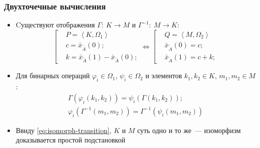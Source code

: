 \documentclass[12pt]{beamer}
\begin{document}
\begin{frame}
  \frametitle{Двухточечные вычисления}
  \begin{itemize}
  \item Cуществуют отображения $\Gamma:\ K \to M$ и $\Gamma^{-1}:\ M \to K$:
\begin{equation}
  \label{eq:isomorph-transition}
  \left[ \begin{aligned}
    & P=\left\langle K, \Omega_1 \right\rangle \\
    & c=\bar{x}_{\tilde A}\left( 0 \right); \\ 
    & k=\bar{x}_{\tilde A}\left( 1 \right)-\bar{x}_{\tilde A}\left( 0 \right);
  \end{aligned} \right.
  \Leftrightarrow 
  \left[ \begin{aligned}
    & Q=\left\langle M, \Omega_2 \right\rangle \\
    & \bar{x}_{\tilde A}\left( 0 \right)=c; \\ 
    & \bar{x}_{\tilde A}\left( 1 \right)=c+k;
  \end{aligned} \right.
\end{equation}
  \item Для бинарных операций $\varphi_i \in \Omega_1$, $\psi_i \in \Omega_2$ и элементов $k_1, k_2 \in K$, $m_1, m_2 \in M$:
\begin{gather}
  \label{eq:gomomorph-1}
  \Gamma\left( \varphi_i \left( k_1, k_2 \right) \right) = \psi_i\left( \Gamma \left(k_1, k_2 \right) \right); \\
  \label{eq:gomomorph-2}
  \varphi_i\left( \Gamma^{-1} \left(m_1, m_2 \right) \right) = \Gamma^{-1}\left( \psi_i \left(m_1, m_2 \right) \right)
\end{gather}
  \item Ввиду \eqref{eq:isomorph-transition}, $K$ и $M$ суть одно и то же~--- изоморфизм доказывается простой подстановкой
  \end{itemize}
\end{frame}

\end{document}
